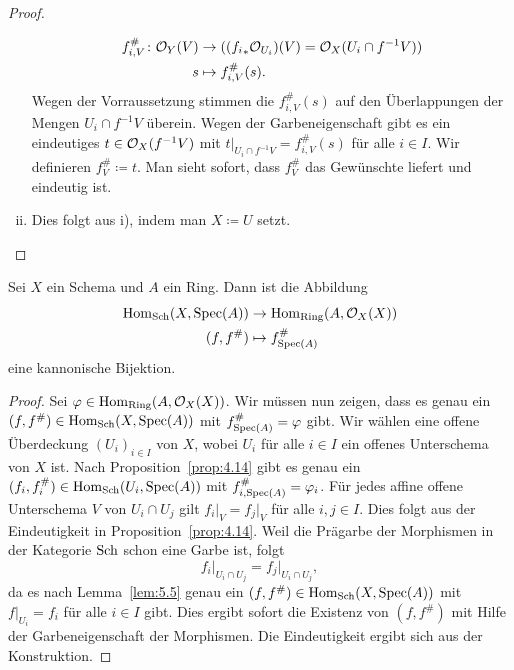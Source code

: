 \begin{lem}
\begin{proof}
\begin{enumerate}[i)]
\begin{align*}
				f_{i,V}^{\#}\colon \mathcal{O}_Y(V)&\to (({f_i}_*\mathcal{O}_{U_i})(V) = \mathcal{O}_X(U_i \cap f^{-1}V))\\
				s &\mapsto f^{\#}_{i,V}(s).
			\end{align*}
			Wegen der Vorraussetzung stimmen die $f_{i,V}^{\#}(s)$ auf den Überlappungen der Mengen $U_i\cap f^{-1}V$ überein. Wegen der Garbeneigenschaft gibt es ein eindeutiges $t \in \mathcal{O}_X(f^{-1}V)$ mit $t\vert_{U_i\cap f^{-1}V} = f_{i,V}^{\#}(s)$ für alle $i \in I$. Wir definieren $f^{\#}_V \coloneqq t$. Man sieht sofort, dass $f_V^{\#}$ das Gewünschte liefert und eindeutig ist.
			\item Dies folgt aus i), indem man $X \coloneqq U$ setzt.
		\end{enumerate}
	\end{proof}
\end{lem}

\begin{prop}
\label{prop:5.6}
	Sei $X$ ein Schema und $A$ ein Ring. Dann ist die Abbildung
	\begin{align*}
		\operatorname{Hom}_{\operatorname{Sch}}(X,\operatorname{Spec}(A)) &\to \operatorname{Hom}_{\operatorname{Ring}}(A,\mathcal{O}_X(X))\\
		(f,f^{\#}) & \mapsto f^{\#}_{\operatorname{Spec}(A)}
	\end{align*}
	eine kannonische Bijektion.
	\begin{proof}
		Sei $\varphi\in \operatorname{Hom}_{\operatorname{Ring}}(A,\mathcal{O}_X(X))$. Wir müssen nun zeigen, dass es genau ein $(f,f^{\#}) \in \operatorname{Hom}_{\operatorname{Sch}}(X,\operatorname{Spec}(A))$ mit $f^{\#}_{\operatorname{Spec}(A)} = \varphi$ gibt. Wir wählen eine offene Überdeckung $(U_i)_{i\in I}$ von $X$, wobei $U_i$ für alle $i \in I$ ein offenes Unterschema von $X$ ist. Nach Proposition~\ref{prop:4.14} gibt es genau ein $(f_i,f_i^{\#}) \in \operatorname{Hom}_{\operatorname{Sch}}(U_i,\operatorname{Spec}(A))$ mit $f^{\#}_{i,\operatorname{Spec}(A)} = \varphi_i$. Für jedes affine offene Unterschema $V$ von $U_i \cap U_j$ gilt $f_i\vert_V = f_j\vert_V$ für alle $i,j \in I$. Dies folgt aus der Eindeutigkeit in Proposition~\ref{prop:4.14}. Weil die Prägarbe der Morphismen in der Kategorie $\operatorname{Sch}$ schon eine Garbe ist, folgt
		\[
			f_i\vert_{U_i\cap U_j} = f_j\vert_{U_i\cap U_j},
		\]
		da es nach Lemma~\ref{lem:5.5} genau ein $(f,f^{\#}) \in \operatorname{Hom}_{\operatorname{Sch}}(X,\operatorname{Spec}(A))$ mit $f\vert_{U_i} = f_i$ für alle $i \in I$ gibt. Dies ergibt sofort die Existenz von $(f,f^{\#})$ mit Hilfe der Garbeneigenschaft der Morphismen. Die Eindeutigkeit ergibt sich aus der Konstruktion.
	\end{proof}
\end{prop}

